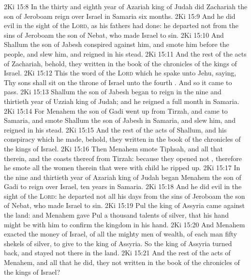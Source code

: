 \vs 2Ki 15:8 In the thirty and eighth year of Azariah king of Judah did Zachariah the son of Jeroboam reign over Israel in Samaria six months.
\vs 2Ki 15:9 And he did  evil in the sight of the \textsc{Lord}, as his fathers had done: he departed not from the sins of Jeroboam the son of Nebat, who made Israel to sin.
\vs 2Ki 15:10 And Shallum the son of Jabesh conspired against him, and smote him before the people, and slew him, and reigned in his stead.
\vs 2Ki 15:11 And the rest of the acts of Zachariah, behold, they  written in the book of the chronicles of the kings of Israel.
\vs 2Ki 15:12 This  the word of the \textsc{Lord} which he spake unto Jehu, saying, Thy sons shall sit on the throne of Israel unto the fourth . And so it came to pass.
\vs 2Ki 15:13 Shallum the son of Jabesh began to reign in the nine and thirtieth year of Uzziah king of Judah; and he reigned a full month in Samaria.
\vs 2Ki 15:14 For Menahem the son of Gadi went up from Tirzah, and came to Samaria, and smote Shallum the son of Jabesh in Samaria, and slew him, and reigned in his stead.
\vs 2Ki 15:15 And the rest of the acts of Shallum, and his conspiracy which he made, behold, they  written in the book of the chronicles of the kings of Israel.
\vs 2Ki 15:16 Then Menahem smote Tiphsah, and all that  therein, and the coasts thereof from Tirzah: because they opened not , therefore he smote  all the women therein that were with child he ripped up.
\vs 2Ki 15:17 In the nine and thirtieth year of Azariah king of Judah began Menahem the son of Gadi to reign over Israel,  ten years in Samaria.
\vs 2Ki 15:18 And he did  evil in the sight of the \textsc{Lord}: he departed not all his days from the sins of Jeroboam the son of Nebat, who made Israel to sin.
\vs 2Ki 15:19  Pul the king of Assyria came against the land: and Menahem gave Pul a thousand talents of silver, that his hand might be with him to confirm the kingdom in his hand.
\vs 2Ki 15:20 And Menahem exacted the money of Israel,  of all the mighty men of wealth, of each man fifty shekels of silver, to give to the king of Assyria. So the king of Assyria turned back, and stayed not there in the land.
\vs 2Ki 15:21 And the rest of the acts of Menahem, and all that he did,  they not written in the book of the chronicles of the kings of Israel?

